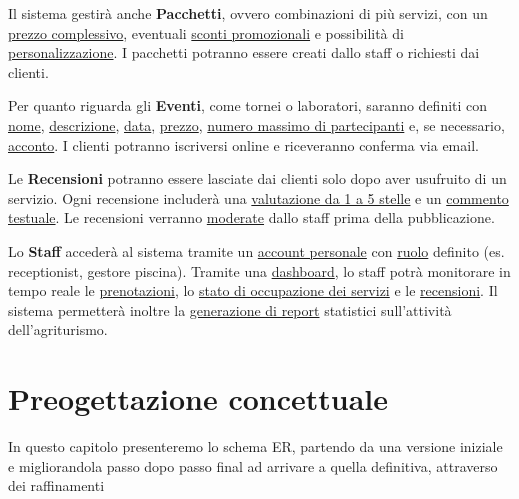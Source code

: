 \documentclass[a4paper,12pt]{report}
\begin{document}
Il sistema gestirà anche \textbf{Pacchetti}, ovvero combinazioni \newline di più servizi, con un \underline{prezzo complessivo},
eventuali \underline{sconti promozionali} e possibilità \newline di \underline{personalizzazione}. I pacchetti potranno essere creati dallo staff o richiesti dai clienti.

Per quanto riguarda gli \textbf{Eventi}, come tornei o laboratori, saranno definiti con \underline{nome}, \newline \underline{descrizione}, \underline{data},
\underline{prezzo}, \underline{numero massimo di partecipanti} e, se necessario, \underline{acconto}. I clienti potranno iscriversi online e riceveranno conferma via email.

Le \textbf{Recensioni} potranno essere lasciate dai clienti solo dopo aver usufruito di un servizio. Ogni recensione includerà
una \underline{valutazione da 1 a 5 stelle} e un \underline{commento testuale}. Le recensioni verranno \underline{moderate} dallo staff prima della pubblicazione.

Lo \textbf{Staff} accederà al sistema tramite un \underline{account personale} con \underline{ruolo} definito (es. receptionist, gestore piscina). Tramite
una \underline{dashboard}, lo staff potrà monitorare in tempo reale le \underline{prenotazioni}, lo \underline{stato di occupazione dei servizi} e le
\underline{recensioni}. Il sistema permetterà inoltre la \underline{generazione di report} statistici sull'attività dell'agriturismo.


\chapter{Preogettazione concettuale}
In questo capitolo presenteremo lo schema ER, partendo da una versione iniziale e migliorandola passo dopo passo final ad arrivare a quella
definitiva, attraverso dei raffinamenti
\end{document}
